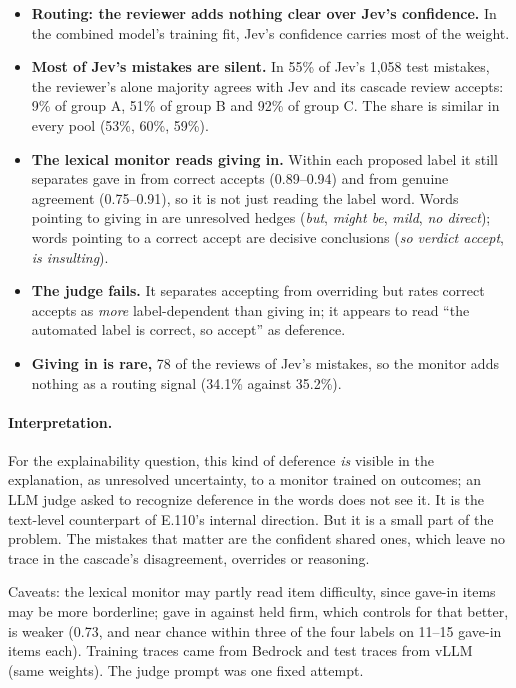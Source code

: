\documentclass[11pt]{article}
\renewcommand{\_}{\origunderscore\allowbreak}
\begin{document}
\begin{itemize}[leftmargin=*]
  \item \textbf{Routing: the reviewer adds nothing clear over Jev's confidence.} In the combined model's training fit, Jev's confidence carries most of the weight.
  \item \textbf{Most of Jev's mistakes are silent.} In 55\% of Jev's 1{,}058 test mistakes, the reviewer's alone majority agrees with Jev and its cascade review accepts: 9\% of group A, 51\% of group B and 92\% of group C. The share is similar in every pool (53\%, 60\%, 59\%).
  \item \textbf{The lexical monitor reads giving in.} Within each proposed label it still separates gave in from correct accepts (0.89--0.94) and from genuine agreement (0.75--0.91), so it is not just reading the label word. Words pointing to giving in are unresolved hedges (\emph{but}, \emph{might be}, \emph{mild}, \emph{no direct}); words pointing to a correct accept are decisive conclusions (\emph{so verdict accept}, \emph{is insulting}).
  \item \textbf{The judge fails.} It separates accepting from overriding but rates correct accepts as \emph{more} label-dependent than giving in; it appears to read ``the automated label is correct, so accept'' as deference.
  \item \textbf{Giving in is rare,} 78 of the reviews of Jev's mistakes, so the monitor adds nothing as a routing signal (34.1\% against 35.2\%).
\end{itemize}

\paragraph{Interpretation.}
For the explainability question, this kind of deference \emph{is} visible in the explanation, as unresolved uncertainty, to a monitor trained on outcomes; an LLM judge asked to recognize deference in the words does not see it. It is the text-level counterpart of E.110's internal direction. But it is a small part of the problem. The mistakes that matter are the confident shared ones, which leave no trace in the cascade's disagreement, overrides or reasoning.

Caveats: the lexical monitor may partly read item difficulty, since gave-in items may be more borderline; gave in against held firm, which controls for that better, is weaker (0.73, and near chance within three of the four labels on 11--15 gave-in items each). Training traces came from Bedrock and test traces from vLLM (same weights). The judge prompt was one fixed attempt.
\end{document}
